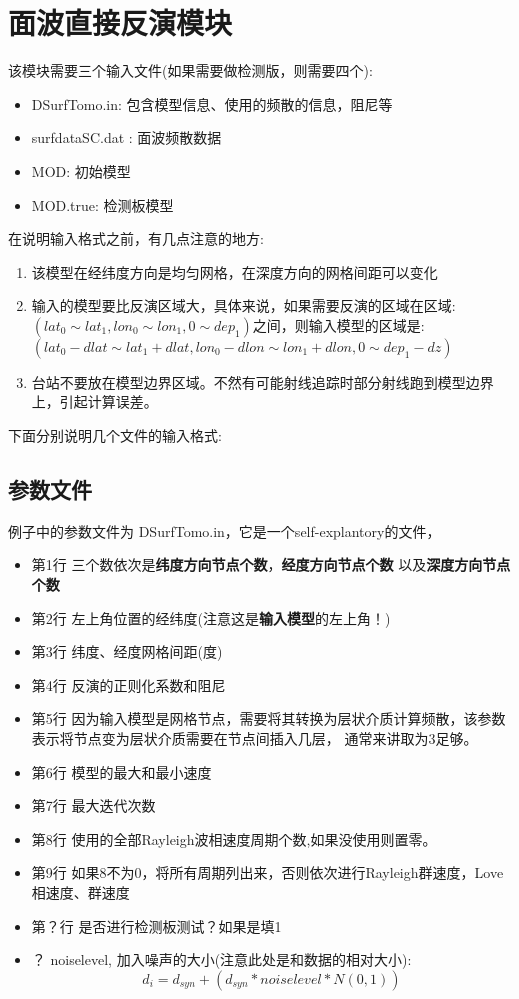 \documentclass[10p,UTF8]{ctexart}
\begin{document}
   \section{面波直接反演模块}
   该模块需要三个输入文件(如果需要做检测版，则需要四个):
   \begin{itemize}
       \item DSurfTomo.in: 包含模型信息、使用的频散的信息，阻尼等
       \item surfdataSC.dat : 面波频散数据
       \item MOD: 初始模型
       \item MOD.true: 检测板模型
   \end{itemize}
   在说明输入格式之前，有几点注意的地方:
   \begin{enumerate}[(1)]
        \item 该模型在经纬度方向是均匀网格，在深度方向的网格间距可以变化
       \item 输入的模型要比反演区域大，具体来说，如果需要反演的区域在区域:
              $(lat_0 \sim lat_1,lon_0\sim lon_1,0\sim dep_1)$之间，则输入模型的区域是:
              $(lat_0-dlat \sim lat_1+dlat, lon_0-dlon \sim lon_1+dlon,0 \sim dep_1-dz)$
        \item 台站不要放在模型边界区域。不然有可能射线追踪时部分射线跑到模型边界上，引起计算误差。
   \end{enumerate}
   下面分别说明几个文件的输入格式:
   \subsection{参数文件}
   例子中的参数文件为 DSurfTomo.in，它是一个self-explantory的文件，
   \begin{itemize}
       \item 第1行 三个数依次是\textbf{纬度方向节点个数}，\textbf{经度方向节点个数}
                   以及\textbf{深度方向节点个数}
       \item 第2行 左上角位置的经纬度(注意这是\textbf{输入模型}的左上角！)
       \item 第3行 纬度、经度网格间距(度)
       \item 第4行 反演的正则化系数和阻尼
       \item 第5行 因为输入模型是网格节点，需要将其转换为层状介质计算频散，该参数表示将节点变为层状介质需要在节点间插入几层，
                    通常来讲取为3足够。
       \item 第6行 模型的最大和最小速度
       \item 第7行 最大迭代次数
       \item 第8行 使用的全部Rayleigh波相速度周期个数,如果没使用则置零。
       \item 第9行 如果8不为0，将所有周期列出来，否则依次进行Rayleigh群速度，Love相速度、群速度
       \item 第？行 是否进行检测板测试？如果是填1
       \item ？  noiselevel, 加入噪声的大小(注意此处是和数据的相对大小):
       \[   
           d_i = d_{syn} + (d_{syn} * noiselevel * N(0,1))
        \]
   \end{itemize}
\end{document}
